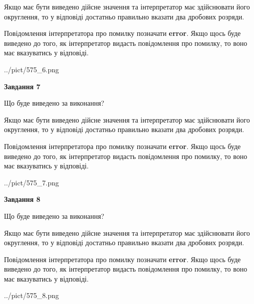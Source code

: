 \documentclass[12pt, ukrainian]{article}
\begin{document}
{\begin {Large}
Якщо має бути виведено дійсне значення та інтерпретатор має здійснювати його округлення, 
то у відповіді достатньо правильно вказати два дробових розряди.

Повідомлення інтерпретатора про помилку позначати \textbf{error}.
Якщо щось буде виведено до того, як інтерпретатор видасть повідомлення про помилку, 
то воно має вказуватись у відповіді. \par

\begin{center}
	{../pict/575_6.png}
\end{center}
\newpage

{\begin {center}\textbf{Завдання 7}\end {center}}\par
Що буде виведено за виконання? \par

Якщо має бути виведено дійсне значення та інтерпретатор має здійснювати його округлення, 
то у відповіді достатньо правильно вказати два дробових розряди.

Повідомлення інтерпретатора про помилку позначати \textbf{error}.
Якщо щось буде виведено до того, як інтерпретатор видасть повідомлення про помилку, 
то воно має вказуватись у відповіді. \par

\begin{center}
	{../pict/575_7.png}
\end{center}
\newpage

{\begin {center}\textbf{Завдання 8}\end {center}}\par
Що буде виведено за виконання? \par

Якщо має бути виведено дійсне значення та інтерпретатор має здійснювати його округлення, 
то у відповіді достатньо правильно вказати два дробових розряди.

Повідомлення інтерпретатора про помилку позначати \textbf{error}.
Якщо щось буде виведено до того, як інтерпретатор видасть повідомлення про помилку, 
то воно має вказуватись у відповіді. \par

\begin{center}
	{../pict/575_8.png}
\end{center}
\newpage


\end{Large}}
\end{document}
